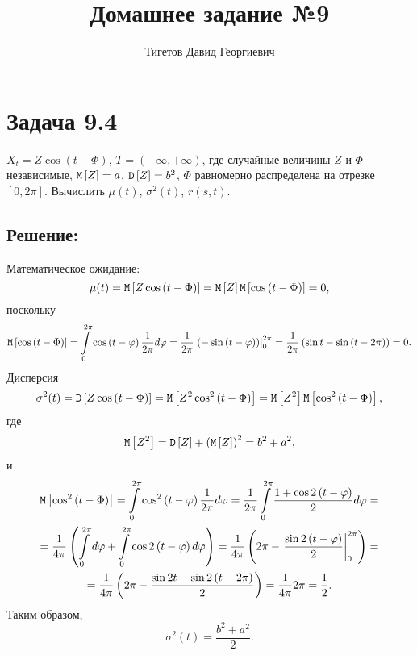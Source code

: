 \documentclass[12pt]{article}
\begin{document}
    \title{Домашнее задание №9}
    \author{Тигетов Давид Георгиевич}
    \date{}
    \maketitle

    \section*{Задача 9.4}
    $X_t = Z \cos \left ( t - \Phi \right )$, $T = \left ( - \infty, + \infty \right )$, где случайные величины $Z$ и $\Phi$ независимые, $\mathtt{M} \left [ Z \right ] = a$, $\mathtt{D} \left [ Z \right ] = b^2$,
    $\Phi$ равномерно распределена на отрезке $\left [ 0, 2 \pi \right ]$. Вычислить $\mu(t)$, $\sigma^2(t)$, $r(s,t)$.

    \subsection*{Решение:}
    Математическое ожидание:
    \[
        \mu(t)
        = \mathtt{M} \left [ Z \cos \left ( t - \Phi \right ) \right ]
        = \mathtt{M} \left [ Z \right ] \mathtt{M} \left [ \cos \left ( t - \Phi \right ) \right ]
        = 0,
    \]
    поскольку
    \[
        \mathtt{M} \left [ \cos \left ( t - \Phi \right ) \right ]
        = \int \limits_0^{2 \pi} \cos \left ( t - \varphi \right ) \frac{1}{2 \pi} d \varphi
        = \frac{1}{2 \pi} \left . \left ( - \sin \left ( t - \varphi \right ) \right ) \right |_0^{2 \pi}
        = \frac{1}{2 \pi} \left ( \sin t - \sin \left ( t - 2 \pi \right ) \right )
        = 0 .
    \]
    Дисперсия
    \[
        \sigma^2(t)
        = \mathtt{D} \left [ Z \cos \left ( t - \Phi \right ) \right ]
        = \mathtt{M} \left [ Z^2 \cos^2 \left ( t - \Phi \right ) \right ]
        = \mathtt{M} \left [ Z^2 \right ] \mathtt{M} \left [ \cos^2 \left ( t - \Phi \right ) \right ],
    \]
    где
    \[
        \mathtt{M} \left [ Z^2 \right ]
        = \mathtt{D} \left [ Z \right ] + \left ( \mathtt{M} \left [ Z \right ] \right )^2
        = b^2 + a^2 ,
    \]
    и
    \begin{multline*}
        \mathtt{M} \left [ \cos^2 \left ( t - \Phi \right ) \right ]
        = \int \limits_0^{2 \pi} \cos^2 \left ( t - \varphi \right ) \frac{1}{2 \pi} d \varphi
        = \frac{1}{2 \pi} \int \limits_0^{2 \pi} \frac{1 + \cos 2 \left ( t - \varphi \right )}{2} d \varphi = \\
        = \frac{1}{4 \pi} \left ( \int \limits_0^{2 \pi} d \varphi + \int \limits_0^{2 \pi} \cos 2 \left ( t - \varphi \right ) d \varphi \right )
        = \frac{1}{4 \pi} \left ( 2 \pi - \left . \frac{\sin 2 \left ( t - \varphi \right )}{2} \right |_0^{2 \pi} \right ) = \\
        = \frac{1}{4 \pi} \left ( 2 \pi - \frac{\sin 2 t - \sin 2 \left ( t - 2 \pi \right )}{2} \right )
        = \frac{1}{4 \pi} 2 \pi
        = \frac{1}{2}.
    \end{multline*}
    Таким образом,
    \[
        \sigma^2(t) = \frac{b^2 + a^2}{2} .
    \]
\end{document}
